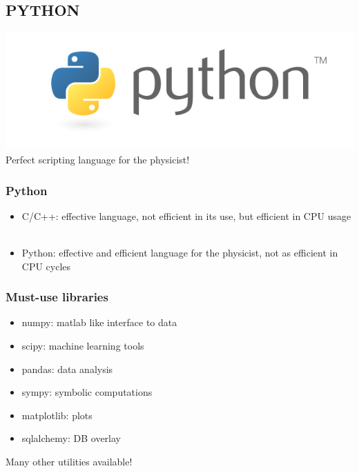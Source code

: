 \documentclass[14pt]{beamer}
\begin{document}
\subsection{PYTHON}
\begin{frame}
\includegraphics[width=\textwidth]{python-logo-master-v3-TM}\\
Perfect scripting language for the physicist!
\end{frame}

\begin{frame}
\frametitle{Python}
\begin{itemize}
\item C/C++: effective language, not efficient in its use, but efficient in CPU usage\\~
\item Python: effective and efficient language for the physicist, not as efficient in CPU cycles
\end{itemize}
\end{frame}

\begin{frame}
\frametitle{Must-use libraries}
\begin{itemize}
\item numpy: matlab like interface to data
\item scipy: machine learning tools
\item pandas: data analysis
\item sympy: symbolic computations
\item matplotlib: plots
\item sqlalchemy: DB overlay
\end{itemize}
Many other utilities available!
\end{frame}
\end{document}
